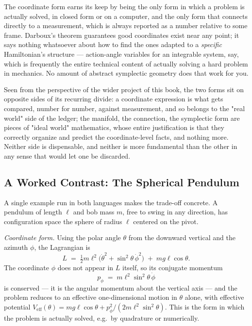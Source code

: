 The coordinate form earns its keep by being the only form in which a
problem is actually solved, in closed form or on a computer, and the
only form that connects directly to a measurement, which is always
reported as a number relative to some frame. Darboux's theorem
guarantees good coordinates exist near any point; it says nothing
whatsoever about how to find the ones adapted to a \emph{specific}
Hamiltonian's structure --- action-angle variables for an integrable
system, say, which is frequently the entire technical content of
actually solving a hard problem in mechanics. No amount of abstract
symplectic geometry does that work for you.

Seen from the perspective of the wider project of this book, the two
forms sit on opposite sides of its recurring divide: a coordinate
expression is what gets compared, number for number, against
measurement, and so belongs to the "real world" side of the ledger;
the manifold, the connection, the symplectic form are pieces of
"ideal world" mathematics, whose entire justification is that they
correctly organize and predict the coordinate-level facts, and
nothing more. Neither side is dispensable, and neither is more
fundamental than the other in any sense that would let one be
discarded.

\subsection{A Worked Contrast: The Spherical Pendulum}

A single example run in both languages makes the trade-off concrete.
A pendulum of length $\ell$ and bob mass $m$, free to swing in any
direction, has configuration space the sphere of radius $\ell$
centered on the pivot.

\emph{Coordinate form.} Using the polar angle $\theta$ from the
downward vertical and the azimuth $\phi$, the Lagrangian is
\begin{equation}
  L \;=\; \tfrac12 m\ell^2\bigl(\dot\theta^2 + \sin^2\theta\,
  \dot\phi^2\bigr) \;+\; mg\ell\cos\theta .
  \label{sph-pendulum-L}
\end{equation}
The coordinate $\phi$ does not appear in $L$ itself, so its conjugate
momentum
\begin{equation}
  p_\phi \;=\; m\ell^2\sin^2\theta\,\dot\phi
  \label{sph-pendulum-pphi}
\end{equation}
is conserved --- it is the angular momentum about the vertical axis
--- and the problem reduces to an effective one-dimensional motion in
$\theta$ alone, with effective potential $V_{\mathrm{eff}}(\theta) =
mg\ell\cos\theta + p_\phi^2/(2m\ell^2\sin^2\theta)$. This is the form
in which the problem is actually solved, e.g.\ by quadrature or
numerically.

